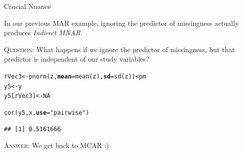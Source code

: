 \documentclass{beamer}\usepackage[]{graphicx}\usepackage[]{color}
\makeatletter
\newcommand{\hlnum}[1]{\textcolor[rgb]{0.69,0.494,0}{#1}}%
\newcommand{\hlstr}[1]{\textcolor[rgb]{0.749,0.012,0.012}{#1}}%
\newcommand{\hlopt}[1]{\textcolor[rgb]{0,0,0}{#1}}%
\newcommand{\hlstd}[1]{\textcolor[rgb]{0,0,0}{#1}}%
\newcommand{\hlkwb}[1]{\textcolor[rgb]{0,0.341,0.682}{#1}}%
\newcommand{\hlkwc}[1]{\textcolor[rgb]{0,0,0}{\textbf{#1}}}%
\newcommand{\hlkwd}[1]{\textcolor[rgb]{0.004,0.004,0.506}{#1}}%
\newenvironment{kframe}{%
 \def\at@end@of@kframe{}%
 \ifinner\ifhmode%
  \def\at@end@of@kframe{\end{minipage}}%
  \begin{minipage}{\columnwidth}%
 \fi\fi%
 \def\FrameCommand##1{\hskip\@totalleftmargin \hskip-\fboxsep
 \colorbox{shadecolor}{##1}\hskip-\fboxsep
     \hskip-\linewidth \hskip-\@totalleftmargin \hskip\columnwidth}%
 \MakeFramed {\advance\hsize-\width
   \@totalleftmargin\z@ \linewidth\hsize
   \@setminipage}}%
 {\par\unskip\endMakeFramed%
 \at@end@of@kframe}
\newenvironment{knitrout}{}{} %
\makeatother
\begin{document}

\begin{frame}[fragile]{Crucial Nuance}
  
  In our previous MAR example, ignoring the predictor of missingness actually 
  produces \emph{Indirect MNAR}.\\
  
  \pause
  \va
  
  \textsc{Question:} What happens if we ignore the predictor of missingness, but
  that predictor is independent of our study variables?
  
  \pause
  
\begin{knitrout}\footnotesize
{}\color{fgcolor}\begin{kframe}
\begin{alltt}
\hlstd{rVec3}     \hlkwb{<-} \hlkwd{pnorm}\hlstd{(z,} \hlkwc{mean} \hlstd{=} \hlkwd{mean}\hlstd{(z),} \hlkwc{sd} \hlstd{=} \hlkwd{sd}\hlstd{(z))} \hlopt{<} \hlstd{pm}
\hlstd{y5}        \hlkwb{<-} \hlstd{y}
\hlstd{y5[rVec3]} \hlkwb{<-} \hlnum{NA}

\hlkwd{cor}\hlstd{(y5, x,} \hlkwc{use} \hlstd{=} \hlstr{"pairwise"}\hlstd{)}
\end{alltt}
\begin{verbatim}
## [1] 0.5161666
\end{verbatim}
\end{kframe}
\end{knitrout}

\textsc{Answer:} We get back to MCAR :)

\end{frame}

\end{document}

